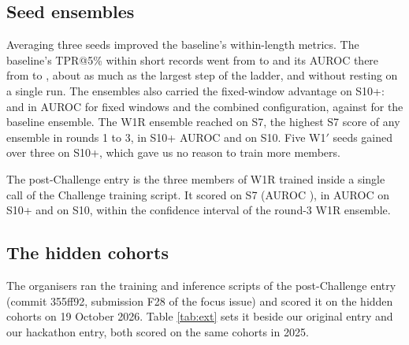 \documentclass{iopjournal}
\makeatletter
\newcommand{\tpr}{TPR@5\%}
\newcommand{\Wp}{W1$'$}
\makeatother
\begin{document}
\subsection{Seed ensembles}
\label{sec:res-ens}
Averaging three seeds improved the baseline's within-length metrics. The baseline's \tpr{} within short records went from \bzSseven{} to \bzEnsSseven{} and its AUROC there from \bzSsevenAuc{} to \bzEnsSsevenAuc, about as much as the largest step of the ladder, and without resting on a single run. The ensembles also carried the fixed-window advantage on S10+: \wOneEnsStenPlusAuc{} and \mwEnsStenPlusAuc{} in AUROC for fixed windows and the combined configuration, against \bzEnsStenPlusAuc{} for the baseline ensemble. The W1R ensemble reached \rThreeWoneREnsSseven{} on S7, the highest S7 score of any ensemble in rounds 1 to 3, \rThreeWoneREnsStenPlusAuc{} in S10+ AUROC and \rThreeWoneREnsStenAuc{} on S10. Five \Wp{} seeds gained \rThreeWfiveVsWoneDEnsStenPlusAuc{} over three on S10+, which gave us no reason to train more members.

The post-Challenge entry is the three members of W1R trained inside a single call of the Challenge training script. It scored \entrySseven{} on S7 (AUROC \entrySsevenAuc), \entryStenPlusAuc{} in AUROC on S10+ and \entryStenAuc{} on S10, within the confidence interval of the round-3 W1R ensemble.

\subsection{The hidden cohorts}
\label{sec:res-ext}
The organisers ran the training and inference scripts of the post-Challenge entry (commit 355ff92, submission F28 of the focus issue) and scored it on the hidden cohorts on 19 October 2026. Table \ref{tab:ext} sets it beside our original entry and our hackathon entry, both scored on the same cohorts in 2025.
\end{document}

